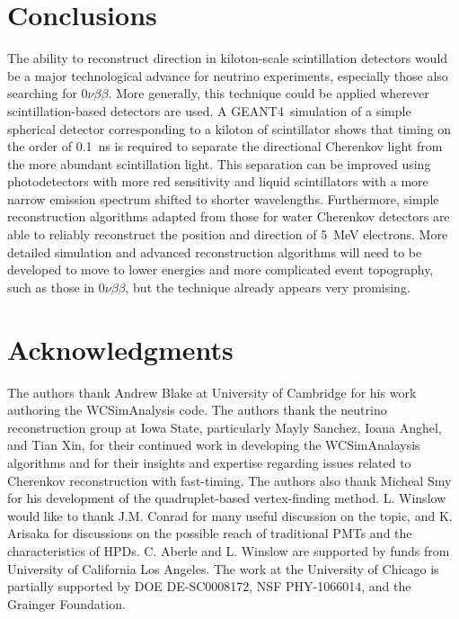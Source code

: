\documentclass[aps,prc,twocolumn,groupedaddress,showpacs,amsmath,amssymb,floatfix,superscriptaddress]{revtex4}
\newcommand{\GEANT}{GEANT4}
\begin{document}
\section{Conclusions}
The ability to reconstruct direction in kiloton-scale scintillation
detectors would be a major technological advance for neutrino
experiments, especially those also
searching for $0\nu\beta\beta$. More generally, this technique could
be applied wherever scintillation-based detectors are used. A \GEANT~simulation of a simple spherical detector corresponding to a kiloton
of scintillator shows that timing on the order of 0.1~ns is required
to separate the directional Cherenkov light from the more abundant
scintillation light. This separation can be improved using
photodetectors with more red sensitivity and liquid scintillators with
a more narrow emission spectrum shifted to shorter
wavelengths. Furthermore, simple reconstruction algorithms adapted
from those for water Cherenkov detectors are able to reliably
reconstruct the position and direction of 5~MeV electrons. More
detailed simulation and advanced reconstruction algorithms will need
to be developed to move to lower energies and more complicated event
topography, such as those in $0\nu\beta\beta$, but the technique already
appears very promising.


\section{Acknowledgments}
The authors thank Andrew Blake at University of Cambridge for his work
authoring the WCSimAnalysis code. The authors thank the neutrino
reconstruction group at Iowa State, particularly Mayly Sanchez, Ioana
Anghel, and Tian Xin, for their continued work in developing the
WCSimAnalaysis algorithms and for their insights and expertise
regarding issues related to Cherenkov reconstruction with
fast-timing. The authors also thank Micheal Smy for his development of the
quadruplet-based vertex-finding method. L. Winslow would like to
thank J.M. Conrad for many useful discussion on the topic, and K. Arisaka
for discussions on the possible reach of traditional PMTs and the
characteristics of HPDs. C. Aberle and L. Winslow are supported by
funds from University of California Los Angeles. The work at the University of Chicago is
partially supported by DOE DE-SC0008172, NSF PHY-1066014, and the
Grainger Foundation.

 
\end{document}
